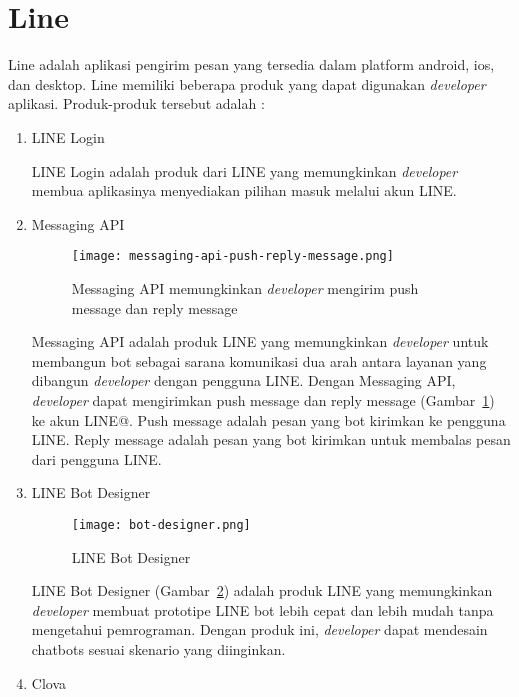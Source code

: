 \section{Line \cite{LINE-developer}}
\label{sec:Line}
Line adalah aplikasi pengirim pesan yang tersedia dalam platform android, ios, dan desktop. Line memiliki beberapa produk yang dapat digunakan \textit{developer} aplikasi. Produk-produk tersebut adalah :
\begin{enumerate}
\item LINE Login

LINE Login adalah produk dari LINE yang memungkinkan \textit{developer} membua aplikasinya menyediakan pilihan masuk melalui akun LINE.

\item Messaging API

\begin{figure}[H]
	\centering  
	\texttt{[image: messaging-api-push-reply-message.png]}  
	\caption[Push message dan reply message pada Messaging API]{Messaging API memungkinkan \textit{developer} mengirim push message dan reply message} 
	\label{fig:messaging-api-push-reply-message} 
\end{figure}

Messaging API adalah produk LINE yang memungkinkan \textit{developer} untuk membangun bot sebagai sarana komunikasi dua arah antara layanan yang dibangun \textit{developer} dengan pengguna LINE. Dengan Messaging API, \textit{developer} dapat mengirimkan push message dan reply message (Gambar~\ref{fig:messaging-api-push-reply-message}) ke akun LINE@. Push message adalah pesan yang bot kirimkan ke pengguna LINE. Reply message adalah pesan yang bot kirimkan untuk membalas pesan dari pengguna LINE.

\item LINE Bot Designer

\begin{figure}[H]
	\centering  
	\texttt{[image: bot-designer.png]}  
	\caption[LINE Bot Designer]{LINE Bot Designer} 
	\label{fig:bot-designer} 
\end{figure}

LINE Bot Designer (Gambar~\ref{fig:bot-designer}) adalah produk LINE yang memungkinkan \textit{developer} membuat prototipe LINE bot lebih cepat dan lebih mudah tanpa mengetahui pemrograman. Dengan produk ini, \textit{developer} dapat mendesain chatbots sesuai skenario yang diinginkan.

\item Clova


\end{enumerate}
